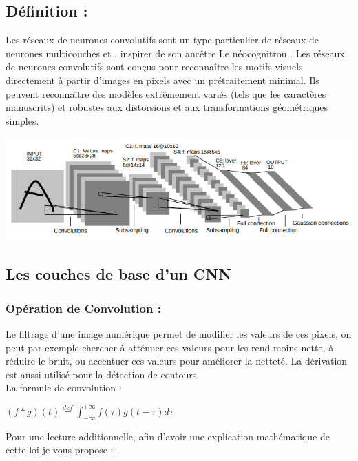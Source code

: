 \subsection{Définition :}
Les réseaux de neurones convolutifs sont un type particulier de réseaux de neurones multicouches \cite{lecun1995convolutional} et \cite{lecun1998gradient}, inspirer de son ancêtre Le néocognitron \cite{fukushima1980neocognitron}. 
Les réseaux de neurones convolutifs sont conçus pour reconnaître les motifs visuels directement à partir d'images en pixels avec un prétraitement minimal.   
Ils peuvent reconnaître des modèles extrêmement variés (tels que les caractères manuscrits) et robustes aux distorsions et aux transformations géométriques simples. 
\begin{center}
	\includegraphics[scale=0.5]{img25.png}
\end{center}
\subsection{Les couches de base d'un CNN}
\subsubsection{Opération de Convolution :}
Le filtrage d’une image numérique permet de modifier les valeurs de ces pixels, on peut par exemple chercher à atténuer ces valeurs pour les rend moins nette, à réduire le bruit, ou accentuer ces valeurs pour améliorer la netteté. La dérivation est aussi utilisé pour la détection de contours.\\[1cm]
La formule de convolution :
\begin{center}
	$(f * g)(t) \overset{def}{=} \int_{-\infty}^{+\infty} f(\tau) g(t - \tau) d\tau$
\end{center}
Pour une lecture additionnelle, afin d'avoir une explication mathématique de cette loi je vous propose : 
\cite{wu2017convolutional}.

